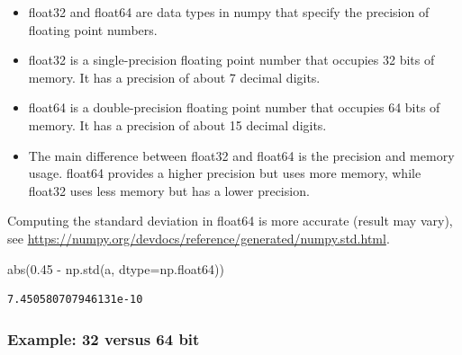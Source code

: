 \documentclass[
  letterpaper,
  DIV=11,
  numbers=noendperiod]{scrreprt}
\newenvironment{Shaded}{\begin{snugshade}}{\end{snugshade}}
\newcommand{\BuiltInTok}[1]{\textcolor[rgb]{0.00,0.23,0.31}{#1}}
\newcommand{\FloatTok}[1]{\textcolor[rgb]{0.68,0.00,0.00}{#1}}
\newcommand{\NormalTok}[1]{\textcolor[rgb]{0.00,0.23,0.31}{#1}}
\newcommand{\OperatorTok}[1]{\textcolor[rgb]{0.37,0.37,0.37}{#1}}
\providecommand{\tightlist}{%
  \setlength{\itemsep}{0pt}\setlength{\parskip}{0pt}}\usepackage{longtable,booktabs,array}
\begin{document}
\begin{tcolorbox}[enhanced jigsaw, rightrule=.15mm, opacityback=0, colframe=quarto-callout-note-color-frame, opacitybacktitle=0.6, toptitle=1mm, arc=.35mm, colbacktitle=quarto-callout-note-color!10!white, coltitle=black, toprule=.15mm, leftrule=.75mm, titlerule=0mm, title=\textcolor{quarto-callout-note-color}{\faInfo}\hspace{0.5em}{Float data types}, bottomrule=.15mm, breakable, bottomtitle=1mm, left=2mm, colback=white]

\begin{itemize}
\tightlist
\item
  float32 and float64 are data types in numpy that specify the precision
  of floating point numbers.
\item
  float32 is a single-precision floating point number that occupies 32
  bits of memory. It has a precision of about 7 decimal digits.
\item
  float64 is a double-precision floating point number that occupies 64
  bits of memory. It has a precision of about 15 decimal digits.
\item
  The main difference between float32 and float64 is the precision and
  memory usage. float64 provides a higher precision but uses more
  memory, while float32 uses less memory but has a lower precision.
\end{itemize}

\end{tcolorbox}

Computing the standard deviation in float64 is more accurate (result may
vary), see
\url{https://numpy.org/devdocs/reference/generated/numpy.std.html}.

\begin{Shaded}
\begin{Highlighting}[]
\BuiltInTok{abs}\NormalTok{(}\FloatTok{0.45} \OperatorTok{{-}}\NormalTok{ np.std(a, dtype}\OperatorTok{=}\NormalTok{np.float64))}
\end{Highlighting}
\end{Shaded}

\begin{verbatim}
7.450580707946131e-10
\end{verbatim}

\hypertarget{example-32-versus-64-bit}{%
\subsubsection{Example: 32 versus 64
bit}\label{example-32-versus-64-bit}}
\end{document}
